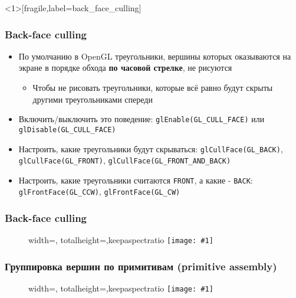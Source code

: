 \documentclass{beamer}
\newcommand{\slideimage}[1]{
  \begin{figure}
    \begin{adjustbox}{width=\textwidth, totalheight=\textheight-2\baselineskip-2\baselineskip,keepaspectratio}
      \texttt{[image: \#1]}
    \end{adjustbox}
  \end{figure}
}
\begin{document}
\begin{frame}<1>[fragile,label=back_face_culling]
\frametitle{Back-face culling}
\begin{itemize}
\item По умолчанию в OpenGL треугольники, вершины которых оказываются на экране в порядке обхода \textbf{по часовой стрелке}, {\color{red}не рисуются}
\pause
\begin{itemize}
\item Чтобы не рисовать треугольники, которые всё равно будут скрыты другими треугольниками спереди
\end{itemize}
\pause
\item Включить/выключить это поведение: \verb|glEnable(GL_CULL_FACE)| или \verb|glDisable(GL_CULL_FACE)|
\pause
\item Настроить, какие треугольники будут скрываться: \verb|glCullFace(GL_BACK)|, \verb|glCullFace(GL_FRONT)|, \verb|glCullFace(GL_FRONT_AND_BACK)|
\pause
\item Настроить, какие треугольники считаются \verb|FRONT|, а какие - \verb|BACK|: \verb|glFrontFace(GL_CCW)|, \verb|glFrontFace(GL_CW)|
\end{itemize}
\end{frame}

\begin{frame}
\frametitle{Back-face culling}
\slideimage{back-face-culling.png}
\end{frame}


\begin{frame}
\frametitle{Группировка вершин по примитивам (primitive assembly)}
\slideimage{primitives.png}
\end{frame}
\end{document}
